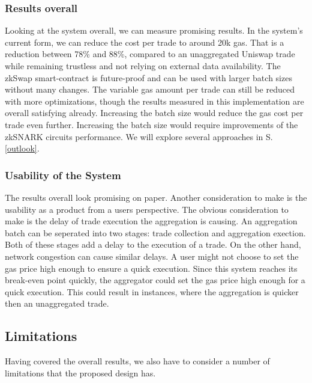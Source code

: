 \documentclass[../../thesis.tex]{subfiles}
\begin{document}
\subsubsection{Results overall}
Looking at the system overall, we can measure promising results. In the system's current form, we can reduce the cost per trade to around 20k gas. That is a reduction between 78\% and 88\%, compared to an unaggregated Uniswap trade while remaining trustless and not relying on external data availability. The zkSwap smart-contract is future-proof and can be used with larger batch sizes without many changes. The variable gas amount per trade can still be reduced with more optimizations, though the results measured in this implementation are overall satisfying already. Increasing the batch size would reduce the gas cost per trade even further. Increasing the batch size would require improvements of the zkSNARK circuits performance. We will explore several approaches in S. \ref{outlook}.

\subsubsection{Usability of the System}
The results overall look promising on paper. Another consideration to make is the usability as a product from a users perspective. The obvious consideration to make is the delay of trade execution the aggregation is causing. An aggregation batch can be seperated into two stages: trade collection and aggregation exection. Both of these stages add a delay to the execution of a trade. On the other hand, network congestion can cause similar delays. A user might not choose to set the gas price high enough to ensure a quick execution. Since this system reaches its break-even point quickly, the aggregator could set the gas price high enough for a quick execution. This could result in instances, where the aggregation is quicker then an unaggregated trade. 

\subsection{Limitations} \label{limitations}
Having covered the overall results, we also have to consider a number of limitations that the proposed design has. 
\end{document}
